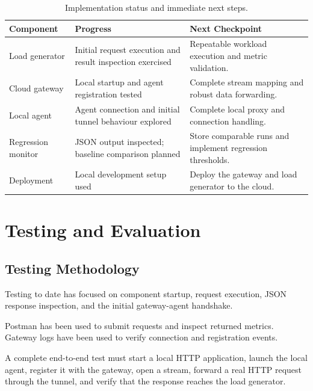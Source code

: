\documentclass[11pt,a4paper,oneside]{report}
\begin{document}
\begin{table}[htbp]
\centering
\small
\begin{tabularx}{\textwidth}{@{}P{0.25\textwidth}YY@{}}
\toprule
\textbf{Component} & \textbf{Progress} & \textbf{Next Checkpoint} \\
\midrule
Load generator &
Initial request execution and result inspection exercised &
Repeatable workload execution and metric validation. \\

Cloud gateway &
Local startup and agent registration tested &
Complete stream mapping and robust data forwarding. \\

Local agent &
Agent connection and initial tunnel behaviour explored &
Complete local proxy and connection handling. \\

Regression monitor &
JSON output inspected; baseline comparison planned &
Store comparable runs and implement regression thresholds. \\

Deployment &
Local development setup used &
Deploy the gateway and load generator to the cloud. \\
\bottomrule
\end{tabularx}
\caption{Implementation status and immediate next steps.}
\label{tab:progress}
\end{table}

\chapter{Testing and Evaluation}

\section{Testing Methodology}

Testing to date has focused on component startup, request
execution, JSON response inspection, and the initial
gateway-agent handshake.

Postman has been used to submit requests and inspect returned
metrics. Gateway logs have been used to verify connection and
registration events.

A complete end-to-end test must start a local HTTP application,
launch the local agent, register it with the gateway, open a
stream, forward a real HTTP request through the tunnel, and
verify that the response reaches the load generator.
\end{document}
